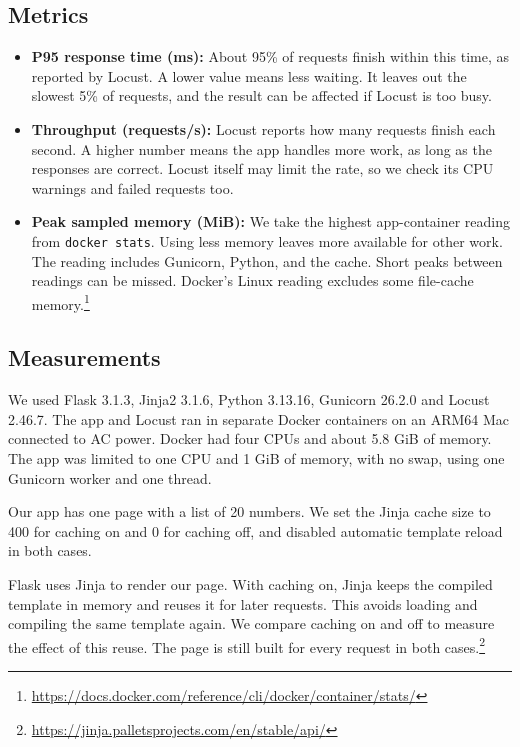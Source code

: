 \documentclass[12pt,a4paper]{article}
\begin{document}
\subsection{Metrics}
\label{sec:performance-metrics}
\begin{itemize}
\item \textbf{P95 response time (ms):} About 95\% of requests finish within this time, as reported by Locust. A lower value means less waiting. It leaves out the slowest 5\% of requests, and the result can be affected if Locust is too busy.
\item \textbf{Throughput (requests/s):} Locust reports how many requests finish each second. A higher number means the app handles more work, as long as the responses are correct. Locust itself may limit the rate, so we check its CPU warnings and failed requests too.
\item \textbf{Peak sampled memory (MiB):} We take the highest app-container reading from \texttt{docker stats}. Using less memory leaves more available for other work. The reading includes Gunicorn, Python, and the cache. Short peaks between readings can be missed. Docker’s Linux reading excludes some file-cache memory.\footnote{\url{https://docs.docker.com/reference/cli/docker/container/stats/}}
\end{itemize}

\subsection{Measurements}
\label{sec:performance-measurements}
We used Flask 3.1.3, Jinja2 3.1.6, Python 3.13.16, Gunicorn 26.2.0 and Locust 2.46.7. The app and Locust ran in separate Docker containers on an ARM64 Mac connected to AC power. Docker had four CPUs and about 5.8 GiB of memory. The app was limited to one CPU and 1 GiB of memory, with no swap, using one Gunicorn worker and one thread.

Our app has one page with a list of 20 numbers. We set the Jinja cache size to 400 for caching on and 0 for caching off, and disabled automatic template reload in both cases.

Flask uses Jinja to render our page. With caching on, Jinja keeps the compiled template in memory and reuses it for later requests. This avoids loading and compiling the same template again. We compare caching on and off to measure the effect of this reuse. The page is still built for every request in both cases.\footnote{\url{https://jinja.palletsprojects.com/en/stable/api/}}
\end{document}
